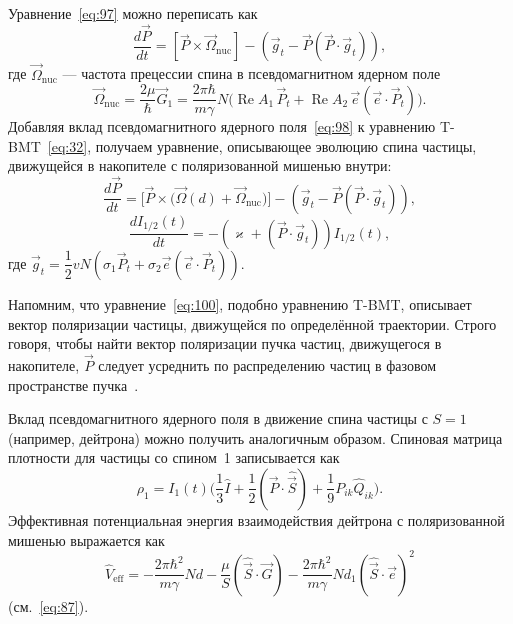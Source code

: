 \documentclass[11pt,a4paper]{article}
\DeclareMathOperator{\Reop}{Re}
\newcommand{\hvec}[1]{\hat{\vec{#1}}}
\begin{document}
Уравнение~\eqref{eq:97} можно переписать как
\begin{equation}
\frac{d\vec{P}}{dt}
=[\vec{P}\times\vec{\Omega}_{\mathrm{nuc}}]
-(\vec{g}_t-\vec{P}(\vec{P}\cdot\vec{g}_t)),
\label{eq:98}
\end{equation}
где $\vec{\Omega}_{\mathrm{nuc}}$ --- частота прецессии спина
в псевдомагнитном ядерном поле
\begin{equation}
\vec{\Omega}_{\mathrm{nuc}}
=\frac{2\mu}{\hbar}\vec{G}_1
=\frac{2\pi\hbar}{m\gamma}N\bigl(
\Reop A_1\,\vec{P}_t+\Reop A_2\,\vec{e}(\vec{e}\cdot\vec{P}_t)
\bigr).
\label{eq:99}
\end{equation}
Добавляя вклад псевдомагнитного ядерного поля~\eqref{eq:98}
к уравнению T-BMT~\eqref{eq:32}, получаем уравнение, описывающее
эволюцию спина частицы, движущейся в накопителе с поляризованной
мишенью внутри:
\begin{equation}
\frac{d\vec{P}}{dt}
=\bigl[\vec{P}\times\bigl(\vec{\Omega}(d)+\vec{\Omega}_{\mathrm{nuc}}\bigr)\bigr]
-(\vec{g}_t-\vec{P}(\vec{P}\cdot\vec{g}_t)),
\label{eq:100}
\end{equation}
\begin{equation}
\frac{d I_{1/2}(t)}{dt}
=-(\varkappa+(\vec{P}\cdot\vec{g}_t))I_{1/2}(t),
\label{eq:101}
\end{equation}
где $\vec{g}_t=\dfrac12 v N(\sigma_1\vec{P}_t+\sigma_2\vec{e}(\vec{e}\cdot\vec{P}_t))$.

Напомним, что уравнение~\eqref{eq:100}, подобно уравнению T-BMT, описывает
вектор поляризации частицы, движущейся по определённой траектории.
Строго говоря, чтобы найти вектор поляризации пучка частиц, движущегося
в накопителе, $\vec{P}$ следует усреднить по распределению частиц
в фазовом пространстве пучка~\cite{Jackson76,Derbenev73,Hoffstaetter06,Hoffstaetter00,Heinemann01,Mane05}.

Вклад псевдомагнитного ядерного поля в движение спина частицы с $S=1$
(например, дейтрона) можно получить аналогичным образом. Спиновая матрица
плотности для частицы со спином~1 записывается как
\begin{equation}
\rho_1=I_1(t)\Biggl(
\frac13\hat{I}+\frac12(\vec{P}\cdot\hvec{S})+\frac19 P_{ik}\hat{Q}_{ik}
\Biggr).
\label{eq:102}
\end{equation}
Эффективная потенциальная энергия взаимодействия дейтрона с поляризованной
мишенью выражается как
\[
\hat{V}_{\mathrm{eff}}
=-\frac{2\pi\hbar^2}{m\gamma}N d
-\frac{\mu}{S}(\hvec{S}\cdot\vec{G})
-\frac{2\pi\hbar^2}{m\gamma}N d_1(\hvec{S}\cdot\vec{e})^2
\]
(см.~\eqref{eq:87}).
\end{document}
